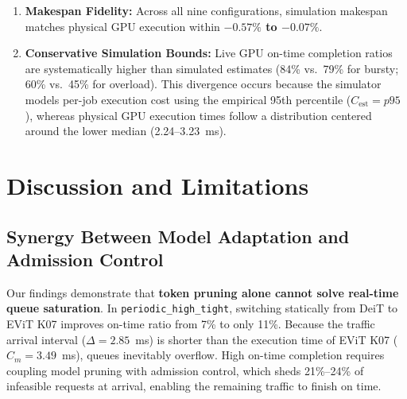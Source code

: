 \documentclass[conference]{IEEEtran}
\begin{document}
\begin{enumerate}
    \item \textbf{Makespan Fidelity:} Across all nine configurations, simulation makespan matches physical GPU execution within \textbf{$-0.57\%$ to $-0.07\%$}.
    \item \textbf{Conservative Simulation Bounds:} Live GPU on-time completion ratios are systematically higher than simulated estimates (84\% vs.\ 79\% for bursty; 60\% vs.\ 45\% for overload). This divergence occurs because the simulator models per-job execution cost using the empirical 95th percentile ($C_{\text{est}} = p95$), whereas physical GPU execution times follow a distribution centered around the lower median (2.24--3.23~ms).
\end{enumerate}

\section{Discussion and Limitations}

\subsection{Synergy Between Model Adaptation and Admission Control}
Our findings demonstrate that \textbf{token pruning alone cannot solve real-time queue saturation}. In \texttt{periodic\_high\_tight}, switching statically from DeiT to EViT K07 improves on-time ratio from 7\% to only 11\%. Because the traffic arrival interval ($\Delta = 2.85$~ms) is shorter than the execution time of EViT K07 ($C_m = 3.49$~ms), queues inevitably overflow. High on-time completion requires coupling model pruning with admission control, which sheds 21\%--24\% of infeasible requests at arrival, enabling the remaining traffic to finish on time.
\end{document}
